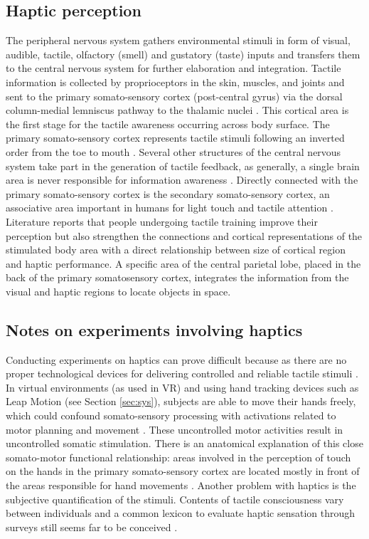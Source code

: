 \documentclass{article}
\begin{document}
\subsection{Haptic perception}
The peripheral nervous system gathers environmental stimuli in form of visual, audible, tactile, olfactory (smell) and gustatory (taste) inputs and transfers them to the central nervous system for further elaboration and integration. Tactile information is collected by proprioceptors in the skin, muscles, and joints and sent to the primary somato-sensory cortex (post-central gyrus) via the dorsal column-medial lemniscus pathway to the thalamic nuclei \cite{Blatow2007}. This cortical area is the first stage for the tactile awareness occurring across body surface. The primary somato-sensory cortex represents tactile stimuli following an inverted order from the toe to mouth \cite{Narici1999}. Several other structures of the central nervous system take part in the generation of tactile feedback, as generally, a single brain area is never responsible for information awareness \cite{Manzoni1986}. Directly connected with the primary somato-sensory cortex is the secondary somato-sensory cortex, an associative area important in humans for light touch and tactile attention \cite{Eickhoff2005}. Literature reports that people undergoing tactile training improve their perception but also strengthen the connections and cortical representations of the stimulated body area \cite{Saito2007} with a direct relationship between size of cortical region and haptic performance. A specific area of the central parietal lobe, placed in the back of the primary somatosensory cortex, integrates the information from the visual and haptic regions to locate objects in space. 

\subsection{Notes on experiments involving haptics}
Conducting experiments on haptics can prove difficult because as there are no proper technological devices for delivering controlled and reliable tactile stimuli \cite{Gallace2012}. In virtual environments (as used in VR) and using hand tracking devices such as Leap Motion \cite{leapwebsite} (see Section \ref{sec:sys}), subjects are able to move their hands freely, which could confound somato-sensory processing with activations related to motor planning and movement \cite{Bodegard2001}. These uncontrolled motor activities result in uncontrolled somatic stimulation. There is an anatomical explanation of this close somato-motor functional relationship: areas involved in the perception of touch on the hands in the primary somato-sensory cortex are located mostly in front of the areas responsible for hand movements \cite{Penfield1950}.
Another problem with haptics is the subjective quantification of the stimuli. Contents of tactile consciousness vary between individuals and a common lexicon to evaluate haptic sensation through surveys still seems far to be conceived \cite{Gallace2010}.
\end{document}
